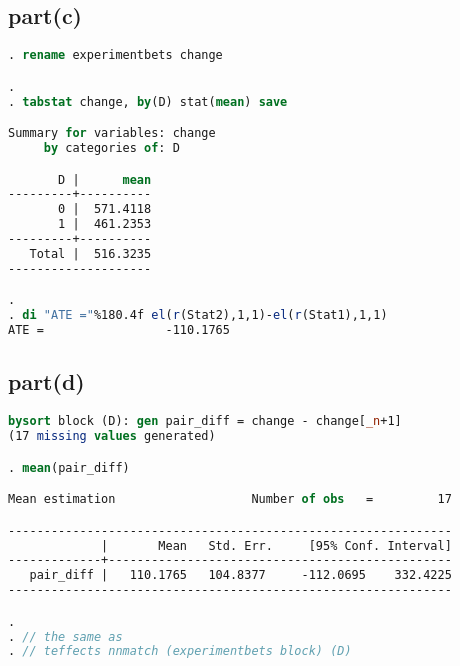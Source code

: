 \documentclass[a4paper]{article}
\begin{document}
\subsection*{part(c)}
\begin{lstlisting}[language=stata]
. rename experimentbets change

. 
. tabstat change, by(D) stat(mean) save   

Summary for variables: change
     by categories of: D 

       D |      mean
---------+----------
       0 |  571.4118
       1 |  461.2353
---------+----------
   Total |  516.3235
--------------------

. 
. di "ATE ="%180.4f el(r(Stat2),1,1)-el(r(Stat1),1,1)
ATE =                 -110.1765


\end{lstlisting}
\subsection*{part(d)}
\begin{lstlisting}[language=stata]
 bysort block (D): gen pair_diff = change - change[_n+1]
(17 missing values generated)

. mean(pair_diff)

Mean estimation                   Number of obs   =         17

--------------------------------------------------------------
             |       Mean   Std. Err.     [95% Conf. Interval]
-------------+------------------------------------------------
   pair_diff |   110.1765   104.8377     -112.0695    332.4225
--------------------------------------------------------------

. 
. // the same as
. // teffects nnmatch (experimentbets block) (D)

\end{lstlisting}
\end{document}
